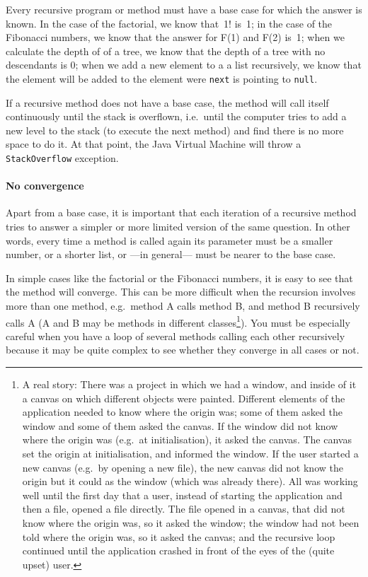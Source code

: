 Every recursive program or method must have a base case for which the
answer is known. In the case of the factorial, we know that~1! is~1;
in the case of the Fibonacci numbers, we know 
that the answer for F(1) and F(2) is~1; when we calculate the depth of
of a tree, we know that the depth of a tree with no descendants is 0;
when we add a new element to a a list recursively, we know that the
element will be added to the element were \verb+next+ is pointing to
\verb+null+. 

If a recursive method does not have a base case, the method will call
itself continuously until the stack is overflown, i.e.~until the
computer tries to add a new level to the stack (to execute the next
method) and find there is no more space to do it. At that point, the
Java Virtual Machine will throw a \verb+StackOverflow+ exception. 

\paragraph{No convergence}
\label{sec:no-convergence}

Apart from a base case, it is important that each iteration of a
recursive method tries to answer a simpler or more limited version of
the same question. In other words, every time a method is called again
its parameter must be a smaller number, or a shorter list, or ---in
general--- must be nearer to the base case. 

In simple cases like the factorial or the Fibonacci numbers, it is
easy to see that the method will converge. This can be more difficult
when the recursion involves more than one method, e.g.~method A calls
method B, and method B recursively calls A (A and B may be methods in
different classes\footnote{A real story: There was a project in which
  we had a window, and inside of it a canvas on which different
  objects were painted. Different elements of the application needed
  to know where the origin was; some of them asked the window and some
  of them asked the canvas. If the window did not know where the
  origin was (e.g.~at initialisation), it asked the canvas. The canvas
  set the origin at initialisation, and informed the window. If the
  user started a new canvas (e.g.~by opening a new file), the new
  canvas did not know the origin but it could as the window (which was
  already there). All was working well until the first day that a
  user, instead of starting the application and then a file, opened a
  file directly. The file opened in a canvas, that did not know where
  the origin was, so it asked the window; the window had not been told
  where the origin was, so it asked the canvas; and the recursive loop
  continued until the application crashed in front of the eyes of the
  (quite upset) user.}). You must be especially careful when you have
a loop of several methods calling each other recursively because it
may be quite complex to see whether they converge in all cases or not.

